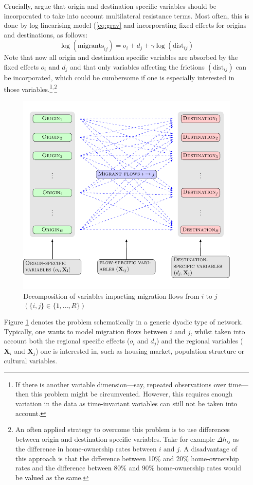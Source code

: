 \documentclass[fleqn,10pt]{SelfArx} %
\begin{document}
Crucially, \citet{anderson2003gravity} argue that origin and destination
specific variables should be incorporated to take into account multilateral
resistance terms. Most often, this is done by log-linearising model
(\ref{eq:grav} and incorporating fixed effects for origins and destinations, as
follows:
\begin{equation}
  \log(\text{migrants}_{ij}) = o_i + d_j +  \gamma\log(\text{dist}_{ij})
  \label{eq:gravfixed}
\end{equation}
Note that now all origin and destination specific variables are absorbed by the
fixed effects $o_i$ and $d_j$ and that only variables affecting the frictions
$(\text{dist}_{ij})$ can be incorporated, which could be cumbersome if one is
especially interested in those variables.\footnote{If there is another variable
  dimension---say, repeated observations over time---then this problem might be
  circumvented. However, this requires enough variation in the data as
  time-invariant variables can still not be taken into account.}$^{,}$\footnote{An
  often applied strategy to overcome this problem is to use differences between
  origin and destination specific variables. Take for example $\Delta h_{ij}$ as
  the difference in home-ownership rates between $i$ and $j$. A disadvantage of
  this approach is that the difference between 10\% and 20\% home-ownership
  rates and the difference between 80\% and 90\% home-ownership rates would be
  valued as the same.}
\begin{figure}[ht]\centering
  \includegraphics[width=\linewidth]{./../../fig/gravity_network.pdf}
  \caption{Decomposition of variables impacting migration flows from $i$ to $j$
    $\left(\{i,j\} \in \{1,\ldots, R\}\right)$}
  \label{fig:gravity_network}
\end{figure}
Figure \ref{fig:gravity_network} denotes the problem schematically in a generic
dyadic type of network. Typically, one wants to model migration flows between
$i$ and $j$, whilst taken into account both the regional specific effects
($o_i$ and $d_j$) and the regional variables ($\mathbf{X}_i$ and
$\mathbf{X}_j$) one is interested in, such as housing market, population
structure or cultural variables.
\end{document}
